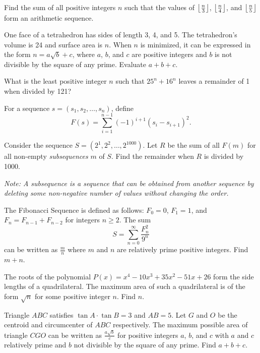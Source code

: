 \documentclass[11pt]{scrartcl}
\begin{document}
\begin{problem}
    Find the sum of all positive integers $n$ such that the values of $\left\lfloor \frac{n}{3} \right\rfloor$, $\left\lfloor \frac{n}{4} \right\rfloor$, and $\left\lfloor \frac{n}{5} \right\rfloor$ form an arithmetic sequence.
\end{problem}

\begin{problem}
    One face of a tetrahedron has sides of length 3, 4, and 5. The tetrahedron's volume is 24 and surface area is $n$. When $n$ is minimized, it can be expressed in the form $n = a\sqrt{b} + c$, where $a$, $b$, and $c$ are positive integers and $b$ is not divisible by the square of any prime. Evaluate $a + b + c$.
\end{problem}

\begin{problem}
    What is the least positive integer $n$ such that $25^{n} + 16^{n}$ leaves a remainder of 1 when divided by 121?
\end{problem}

\begin{problem}
    For a sequence $s = (s_{1}, s_{2}, \dots, s_{n})$, define
    \[F(s) = \sum_{i = 1}^{n - 1} (-1)^{i + 1}(s_{i} - s_{i + 1})^{2}.\]

    Consider the sequence $S = (2^{1}, 2^{2}, \dots, 2^{1000})$. Let $R$ be the sum of all 
    $F(m)$ for all non-empty \emph{subsequences} $m$ of $S$. Find the remainder when $R$ is divided by 1000.

    \emph{Note: A subsequence is a sequence that can be obtained from another sequence by deleting some non-negative number of values without changing the order.}
\end{problem}

\begin{problem}
    The Fibonacci Sequence is defined as follows: $F_{0} = 0$, $F_{1} = 1$, and $F_{n} = F_{n - 1} + F_{n - 2}$ for integers $n \geq 2$. The sum
    \[S = \sum_{n = 0}^{\infty} \frac{F_{n}^{2}}{9^{n}}\]
    can be written as $\frac{m}{n}$ where $m$ and $n$ are relatively prime positive integers. Find $m + n$.
\end{problem}

\begin{problem}
    The roots of the polynomial $P(x) = x^{4} - 10x^{3} + 35x^{2} - 51x + 26$ form the side lengths of a quadrilateral. The maximum area of such a quadrilateral is of the form $\sqrt{n}$ for some positive integer $n$. Find $n$.
\end{problem}

\begin{problem}
    Triangle $ABC$ satisfies $\tan{A} \cdot \tan{B} = 3$ and $AB = 5$. Let $G$ and $O$ be the centroid and circumcenter of $ABC$ respectively. The maximum possible area of triangle $CGO$ can be written as $\frac{a\sqrt{b}}{c}$ for positive integers $a$, 
    $b$, and $c$ with $a$ and $c$ relatively prime and $b$ not divisible by the square of any prime. Find $a + b + c$.
\end{problem}
\end{document}
